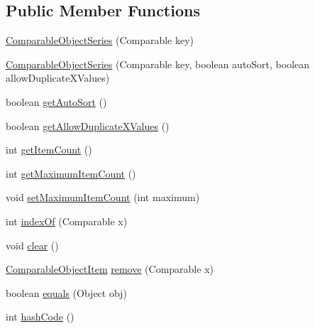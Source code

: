 \subsection*{Public Member Functions}
\begin{DoxyCompactItemize}
\item 
\mbox{\hyperlink{classorg_1_1jfree_1_1data_1_1_comparable_object_series_a290245fbc54c2ed7b2429b58464fd0cc}{Comparable\+Object\+Series}} (Comparable key)
\item 
\mbox{\hyperlink{classorg_1_1jfree_1_1data_1_1_comparable_object_series_ab17013f6a3052e15009de0f140be7830}{Comparable\+Object\+Series}} (Comparable key, boolean auto\+Sort, boolean allow\+Duplicate\+X\+Values)
\item 
boolean \mbox{\hyperlink{classorg_1_1jfree_1_1data_1_1_comparable_object_series_a7c35e4a07051869a7b2e5949b5c69882}{get\+Auto\+Sort}} ()
\item 
boolean \mbox{\hyperlink{classorg_1_1jfree_1_1data_1_1_comparable_object_series_a1f6534ba68282f20dd9fdfc324d71f70}{get\+Allow\+Duplicate\+X\+Values}} ()
\item 
int \mbox{\hyperlink{classorg_1_1jfree_1_1data_1_1_comparable_object_series_a7d4456292704300127b488b286156587}{get\+Item\+Count}} ()
\item 
int \mbox{\hyperlink{classorg_1_1jfree_1_1data_1_1_comparable_object_series_a7d89f1b44afcf80cea75b715e5e9cb36}{get\+Maximum\+Item\+Count}} ()
\item 
void \mbox{\hyperlink{classorg_1_1jfree_1_1data_1_1_comparable_object_series_a77eb1fe6cae39738587baf49592266ab}{set\+Maximum\+Item\+Count}} (int maximum)
\item 
int \mbox{\hyperlink{classorg_1_1jfree_1_1data_1_1_comparable_object_series_a7b9611f61db44619d70344397d15ab42}{index\+Of}} (Comparable x)
\item 
void \mbox{\hyperlink{classorg_1_1jfree_1_1data_1_1_comparable_object_series_a181cb80e8a94e64a9ebc3636b37f3fde}{clear}} ()
\item 
\mbox{\hyperlink{classorg_1_1jfree_1_1data_1_1_comparable_object_item}{Comparable\+Object\+Item}} \mbox{\hyperlink{classorg_1_1jfree_1_1data_1_1_comparable_object_series_a114e1cab4397a3c31881a3dedc88f6dc}{remove}} (Comparable x)
\item 
boolean \mbox{\hyperlink{classorg_1_1jfree_1_1data_1_1_comparable_object_series_a895422199608f70ac2a2ca39a835c4bb}{equals}} (Object obj)
\item 
int \mbox{\hyperlink{classorg_1_1jfree_1_1data_1_1_comparable_object_series_a60758c8d338dff3da555d2d20cc7a453}{hash\+Code}} ()
\end{DoxyCompactItemize}
